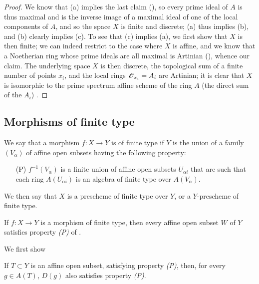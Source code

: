\begin{proof}
\label{proof-1.6.2.2}
We know that (a) implies the last claim (\cite[p.~205, th.~3]{I-13}), so every prime ideal of $A$ is thus maximal and is the inverse image of a maximal ideal of one of the local components of $A$, and so the space $X$ is finite and discrete;
(a) thus implies (b), and (b) clearly implies (c).
To see that (c) implies (a), we first show that $X$ is then finite;
we can indeed restrict to the case where $X$ is affine, and we know that a Noetherian ring whose prime ideals are all maximal is Artinian (\cite[p.~203]{I-13}), whence our claim.
The underlying space $X$ is then discrete, the topological sum of a finite number of points $x_i$, and the local rings $\mathscr{O}_{x_i}=A_i$ are Artinian;
it is clear that $X$ is isomorphic to the prime spectrum affine scheme of the ring $A$ (the direct sum of the $A_i$) .
\end{proof}

\subsection{Morphisms of finite type}
\label{subsection-morphisms-of-finite-type}

\begin{defn}[6.3.1]
\label{1.6.3.1}
We say that a morphism $f:X\to Y$ is of finite type if $Y$ is the union of a family $(V_\alpha)$ of affine open subsets having the following property:
\begin{enumerate}
  \item[(P)] $f^{-1}(V_\alpha)$ is a finite union of affine open subsets $U_{\alpha i}$ that are such that each ring $A(U_{\alpha i})$ is an algebra of finite type over $A(V_\alpha)$.
\end{enumerate}
We then say that $X$ is a prescheme of finite type over $Y$, or a $Y$-prescheme of finite type.
\end{defn}

\begin{prop}[6.3.2]
\label{1.6.3.2}
If $f:X\to Y$ is a morphism of finite type, then every affine open subset $W$ of $Y$ satisfies property \emph{(P)} of .
\end{prop}

We first show
\begin{lem}[6.3.2.1]
\label{1.6.3.2.1}
If $T\subset Y$ is an affine open subset, satisfying property \emph{(P)}, then, for every $g\in A(T)$, $D(g)$ also satisfies property \emph{(P)}.
\end{lem}

